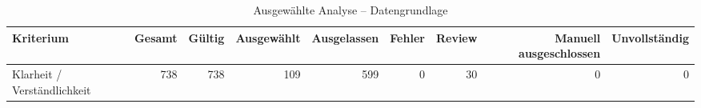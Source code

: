 \begin{table}[htbp]
\centering
\caption{Ausgewählte Analyse -- Datengrundlage}
\begin{tabular}{lrrrrrrrr}
\toprule
Kriterium & Gesamt & Gültig & Ausgewählt & Ausgelassen & Fehler & Review & Manuell ausgeschlossen & Unvollständig \\
\midrule
Klarheit / Verständlichkeit & 738 & 738 & 109 & 599 & 0 & 30 & 0 & 0 \\
\bottomrule
\end{tabular}
\end{table}
